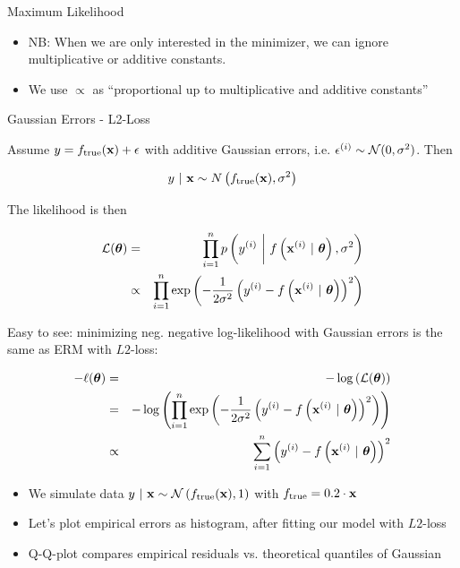 \documentclass[11pt,compress,t,notes=noshow, xcolor=table]{beamer}
\begin{document}
\begin{vbframe}{Maximum Likelihood}
\begin{itemize}
\item NB: When we are only interested in the minimizer, we can ignore multiplicative or additive constants.
\item We use $\propto$ as \enquote{proportional up to multiplicative and additive constants}

\end{itemize}

\end{vbframe}


\begin{vbframe}{Gaussian Errors - L2-Loss} 

Assume $y = f_{\text{true}}(\mathbf{x}) + \epsilon$ with additive Gaussian errors, i.e. $\epsilon^{(i)} \sim \mathcal{N}(0, \sigma^2)$. Then

$$y~|~\mathbf{x} \sim N\left(f_{\text{true}}(\mathbf{x}), \sigma^2\right)$$


The likelihood is then 

\begin{eqnarray*}
\mathcal{L}(\bm{\theta}) &=& \prod\limits_{i=1}^n p\left(y^{(i)} ~\bigg|~ f\left(\mathbf{x}^{(i)} ~|~ \bm{\theta}\right), \sigma^2\right) \\ &\propto& \prod\limits_{i=1}^n \exp\left(-\frac{1}{2\sigma^2} \left(y^{(i)} - f\left(\mathbf{x}^{(i)} ~|~ \bm{\theta}\right)\right)^2\right)
\end{eqnarray*}

\framebreak 

Easy to see: minimizing neg. negative log-likelihood with Gaussian errors is the same as ERM with $L2$-loss:

\begin{eqnarray*}
- \ell(\bm{\theta}) &=& - \log\left(\mathcal{L}(\bm{\theta})\right) \\
&=& - \log\left(\prod\limits_{i=1}^n \exp\left(-\frac{1}{2\sigma^2} \left(y^{(i)} - f\left(\mathbf{x}^{(i)} ~|~ \bm{\theta}\right)\right)^2\right)\right) \\
&\propto& \sum\limits_{i=1}^n \left(y^{(i)} - f\left(\mathbf{x}^{(i)} ~|~ \bm{\theta}\right)\right)^2
\end{eqnarray*}



\framebreak 

\begin{footnotesize}
\begin{itemize}
	\item We simulate data $y ~|~\mathbf{x} \sim \mathcal{N}\left(f_{\text{true}}(\mathbf{x}), 1\right)$ with $f_{\text{true}} = 0.2 \cdot \mathbf{x}$ 
\item Let's plot empirical errors as histogram, after fitting our model with $L2$-loss
\item Q-Q-plot compares empirical residuals vs. theoretical quantiles of Gaussian 
\end{itemize}
\end{footnotesize}


\end{vbframe}
\end{document}
